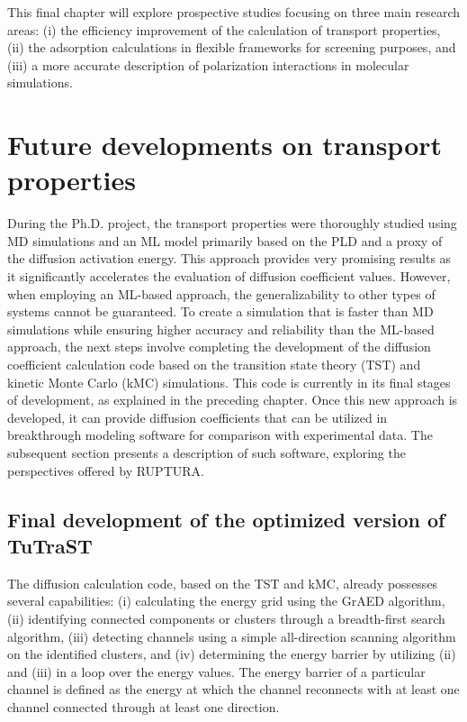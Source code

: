 \documentclass[main]{subfiles}
\begin{document}
This final chapter will explore prospective studies focusing on three main research areas: (i) the efficiency improvement of the calculation of transport properties, (ii) the adsorption calculations in flexible frameworks for screening purposes, and (iii) a more accurate description of polarization interactions in molecular simulations.

\section{Future developments on transport properties}

During the Ph.D. project, the transport properties were thoroughly studied using MD simulations and an ML model primarily based on the PLD and a proxy of the diffusion activation energy. This approach provides very promising results as it significantly accelerates the evaluation of diffusion coefficient values. However, when employing an ML-based approach, the generalizability to other types of systems cannot be guaranteed. To create a simulation that is faster than MD simulations while ensuring higher accuracy and reliability than the ML-based approach, the next steps involve completing the development of the diffusion coefficient calculation code based on the transition state theory (TST) and kinetic Monte Carlo (kMC) simulations. This code is currently in its final stages of development, as explained in the preceding chapter. Once this new approach is developed, it can provide diffusion coefficients that can be utilized in breakthrough modeling software for comparison with experimental data. The subsequent section presents a description of such software, exploring the perspectives offered by RUPTURA\autocite{Sharma_2023}.

\subsection{Final development of the optimized version of TuTraST}

The diffusion calculation code, based on the TST and kMC, already possesses several capabilities: (i) calculating the energy grid using the GrAED algorithm, (ii) identifying connected components or clusters through a breadth-first search algorithm, (iii) detecting channels using a simple all-direction scanning algorithm on the identified clusters, and (iv) determining the energy barrier by utilizing (ii) and (iii) in a loop over the energy values. The energy barrier of a particular channel is defined as the energy at which the channel reconnects with at least one channel connected through at least one direction.
\end{document}
